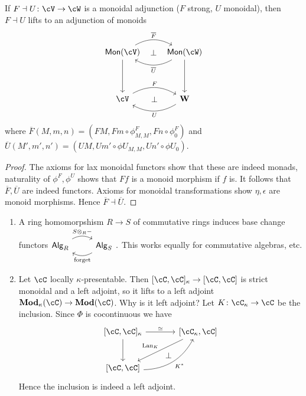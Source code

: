 \documentclass[a4paper,11pt,oneside,openany]{scrbook}
\begin{document}
\begin{prop}
    If $ F \dashv U \from\cV\to \cW $ is a monoidal adjunction ($ F $ strong, $ U $ monoidal), then $ F\dashv U $ lifts to an adjunction of monoids
\begin{displaymath}
    \begin{tikzcd}[row sep = 4em]
        \Mon(\cV)\arrow[d] \arrow[r,bend left, "\overline F"]\arrow[r,phantom, "\bot"] & \Mon(\cW) \arrow[l, bend left, "\overline U"] \arrow[d]\\
       \cV\arrow[r,bend left, "F"] \arrow[r,phantom, "\bot"]& \catname W \arrow[l, bend left, "U"]
    \end{tikzcd}
    \end{displaymath}
    where $ \overline F(M,m,n) = (FM, Fm \circ \phi_{M,M}^F, Fn \circ \phi_0^F) $
    and $ \overline U(M',m',n') = (UM, Um'\circ \phi U_{M,M}, Un'\circ \phi U_0) $.
\end{prop}
\begin{proof}
    The axioms for lax monoidal functors show that these are indeed monads,
    naturality of $ \phi^F, \phi^U $ shows that $ Ff $ is a monoid morphism if $ f $ is.
    It follows that $ \overline F,\overline U $ are indeed functors.
    Axioms for monoidal transformations show $ \eta, \epsilon $ are monoid morphisms.
    Hence $ \overline F \dashv \overline U $.
\end{proof}
\begin{exmp}
    \begin{enumerate}[label=\roman*)]
        \item A ring homomorpshism $ R \to S $ of commutative rings induces base change functors$\begin{tikzcd}
        \mathsf{Alg}_R \arrow[r, "S\otimes_R -", bend left] & \mathsf{Alg}_S \arrow[l,"\text{forget}", bend left]
        \end{tikzcd}.$
        This works equally for commutative algebras, etc.
    \item Let $ \cC$ locally $ \kappa $-presentable. Then $ [\cC,\cC]_\kappa \to [\cC,\cC] $ is strict monoidal and a     left adjoint, so it lifts to a left adjoint $ \Mod_\kappa (\cC) \to \Mod(\cC) $.
        Why is it left adjoint? Let $ K\from \cC_\kappa \to \cC$ be the inclusion. Since $ \Phi $ is cocontinuous we have
        \begin{displaymath}
            \begin{tikzcd}[row sep = large, column sep = large]
            \lbrack\cC,\cC\rbrack_\kappa
            \arrow[r, "\simeq"]\arrow[d] &
            \lbrack\cC_\kappa,\cC\rbrack \arrow[dl, "\Lan_K"']\arrow[dl, phantom, "\bot", bend left=15] 
            \\
            \lbrack\cC, \cC\rbrack \arrow[ru, "K^*"', bend right]
            \end{tikzcd}
        \end{displaymath}
        Hence the inclusion is indeed a left adjoint.
    \end{enumerate}
\end{exmp}
\end{document}
